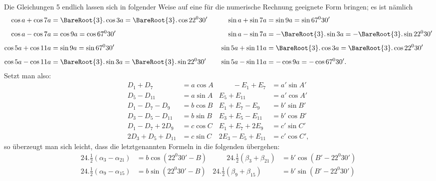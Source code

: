 \clearpage
\begin{landscape}
\begingroup
\fontsize{9.5}{12}\selectfont
{}
\renewcommand{\headrulewidth}{0pt}
\makeatletter\tagsleft@true\let\veqno\@@leqno\makeatother
\setlength{\lineskip}{4pt}\setlength{\lineskiplimit}{4pt}
\newcommand{\VthreeRaisedPoint}{\mathord{\text{\raisebox{.5ex}{.}}}}
\newcommand{\VthreeUpperMark}{\mathord{\text{\makebox[.15em][l]{\kern.25em\raisebox{1.7ex}{\rule{.11em}{.055ex}}}}}}
\newcommand{\VthreeFractionLowPoint}{\mathord{\text{\makebox[0pt][l]{\kern-.25em\raisebox{-.1ex}{\rule{.07em}{.05ex}}}}}}
\par\noindent\hspace*{\parindent}Die Gleichungen 5 endlich lassen sich in folgender Weise auf eine für die numerische Rechnung geeignete Form bringen; es ist nämlich
\[
\begin{aligned}
\cos a+\cos7a&=\BareRoot{3}\mathord{.}\cos3a=\BareRoot{3}\mathord{.}\cos22^0 30'&\qquad\sin a+\sin7a&=\sin9a=\sin67^0 30'\\[4pt]
\cos a-\cos7a&=\cos9a=\cos67^0 30'&\sin a-\sin7a&=-\BareRoot{3}\mathord{.}\sin3a=-\BareRoot{3}\mathord{.}\sin22^0 30'\\[4pt]
\cos5a+\cos11a&=\sin9a=\sin67^0 30'&\sin5a+\sin11a&=\BareRoot{3}\mathord{.}\cos3a=\BareRoot{3}\mathord{.}\cos22^0 30'\\[4pt]
\cos5a-\cos11a&=\BareRoot{3}\mathord{.}\sin3a=\BareRoot{3}\mathord{.}\sin22^0 30'&\sin5a-\sin11a&=-\cos9a=-\cos67^0 30'.
\end{aligned}
\]
Setzt man also:
\[
\begin{aligned}
D_1+D_7&=a\cos A&\qquad-E_1+E_7&=a'\sin A'\\
D_5-D_{11}&=a\sin A&E_5+E_{11}&=a'\cos A'\\[6pt]
D_1-D_7-D_9&=b\cos B&E_1+E_7-E_9&=b'\sin B'\\
D_3-D_5-D_{11}&=b\sin B&E_3+E_5-E_{11}&=b'\cos B'\\[6pt]
D_1-D_7+2D_9&=c\cos C&E_1+E_7+2E_9&=c'\sin C'\\
2D_3+D_5+D_{11}&=c\sin C&2E_3-E_5+E_{11}&=c'\cos C',
\end{aligned}
\]
so überzeugt man sich leicht, dass die letztgenannten Formeln in die folgenden übergehen:
\[
\tag*{V.}
\begin{aligned}
24\mathord{.}\tfrac12(\alpha_3-\alpha_{21})&=b\cos(22^0 30'-B)&\qquad24\mathord{.}\tfrac12(\beta_3+\beta_{21})&=b'\cos(B'-22^0 30')\\[4pt]
24\mathord{.}\tfrac12(\alpha_9-\alpha_{15})&=b\sin(22^0 30'-B)&24\mathord{.}\tfrac12(\beta_9+\beta_{15})&=b'\sin(B'-22^0 30')\\[6pt]

\end{aligned}\]
\end{landscape}
